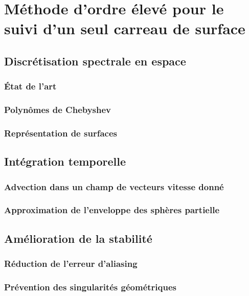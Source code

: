 \chapter[Méthode d'ordre élevé pour le suivi d'un carreau de surface]{Méthode d'ordre élevé pour le suivi d'un seul carreau de surface}
\label{chap:methode_ps}

\section{Discrétisation spectrale en espace}
\subsection{État de l'art}
\subsection{Polynômes de Chebyshev}
\subsection{Représentation de surfaces}

\section{Intégration temporelle}
\subsection{Advection dans un champ de vecteurs vitesse donné}
\subsection{Approximation de l'enveloppe des sphères partielle}

\section{Amélioration de la stabilité}
\subsection{Réduction de l'erreur d'aliasing}
\subsection{Prévention des singularités géométriques}